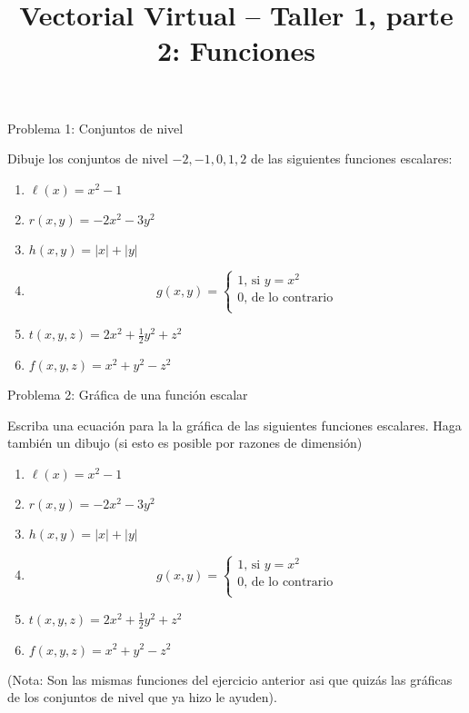 \documentclass[usepdftitle=false]{beamer}
\title[]{Vectorial Virtual -- Taller 1, parte 2: Funciones}
\date{}
\begin{document}
\maketitle
\begin{frame}{Problema 1: Conjuntos de nivel}

Dibuje los conjuntos de nivel $-2,-1,0,1,2$
de las siguientes funciones escalares:

\begin{enumerate}

\item $\ell(x)=x^2-1$
\item $r(x,y)=-2x^2-3y^2$
\item $h(x,y)=|x|+|y|$
\item \[g(x,y)=\begin{cases}
1\text{, si $y=x^2$}\\
0\text{, de lo contrario}\\
\end{cases}
\]
\item $t(x,y,z)=2x^2+\tfrac{1}{2}y^2+z^2$
\item $f(x,y,z)= x^2+y^2-z^2$
\end{enumerate}

\end{frame}

\begin{frame}{Problema 2: Gr\'afica de una funci\'on escalar}

Escriba una ecuaci\'on para la la gr\'afica de las siguientes funciones escalares. Haga tambi\'en un dibujo (si esto es posible por razones de dimensi\'on)

\begin{enumerate}
\item $\ell(x)=x^2-1$
\item $r(x,y)=-2x^2-3y^2$
\item $h(x,y)=|x|+|y|$
\item \[g(x,y)=\begin{cases}
1\text{, si $y=x^2$}\\
0\text{, de lo contrario}\\
\end{cases}
\]

\item $t(x,y,z)=2x^2+\tfrac{1}{2}y^2+z^2$
\item $f(x,y,z)= x^2+y^2-z^2$
\end{enumerate}

(Nota: Son las mismas funciones del ejercicio anterior asi que quiz\'as las gr\'aficas de los conjuntos de nivel que ya hizo le ayuden).

\end{frame}
\end{document}
